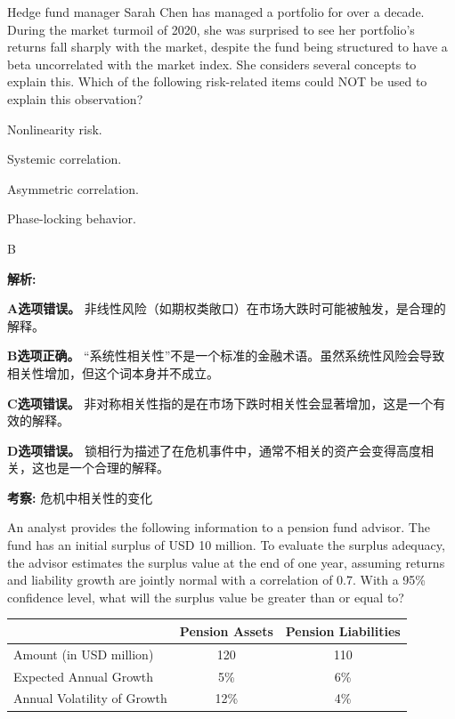\documentclass{article}
\newcounter{question} %
\newenvironment{explanation}
{\textbf{解析:}\par}
{\par}
\newcommand{\checklist}[1]{
    \textbf{考察:} #1 \par %
    \addcontentsline{toc}{subsection}{题号\thequestion 考察: #1} %
    \vspace{2em} %
}
\begin{document}
\begin{question}
    Hedge fund manager Sarah Chen has managed a portfolio for over a decade. During the market turmoil of 2020, she was surprised to see her portfolio's returns fall sharply with the market, despite the fund being structured to have a beta uncorrelated with the market index. She considers several concepts to explain this. Which of the following risk-related items could NOT be used to explain this observation?
\end{question}

\begin{choices}
    \item Nonlinearity risk.
    \item Systemic correlation.
    \item Asymmetric correlation.
    \item Phase-locking behavior.
\end{choices}

\begin{correctanswer}
    B
\end{correctanswer}

\begin{explanation}
    \textbf{A选项错误。}  
    非线性风险（如期权类敞口）在市场大跌时可能被触发，是合理的解释。

    \textbf{B选项正确。}  
    “系统性相关性”不是一个标准的金融术语。虽然系统性风险会导致相关性增加，但这个词本身并不成立。

    \textbf{C选项错误。}  
    非对称相关性指的是在市场下跌时相关性会显著增加，这是一个有效的解释。

    \textbf{D选项错误。}  
    锁相行为描述了在危机事件中，通常不相关的资产会变得高度相关，这也是一个合理的解释。
\end{explanation}
\checklist{危机中相关性的变化}


\begin{question}
    An analyst provides the following information to a pension fund advisor. The fund has an initial surplus of USD 10 million. To evaluate the surplus adequacy, the advisor estimates the surplus value at the end of one year, assuming returns and liability growth are jointly normal with a correlation of 0.7. With a 95\% confidence level, what will the surplus value be greater than or equal to?
    \begin{table}[htbp]
        \centering
        \renewcommand{\arraystretch}{1.2}
        \begin{tabular}{|l|c|c|}
            \hline
            & \textbf{Pension Assets} & \textbf{Pension Liabilities} \\
            \hline
            Amount (in USD million)     & 120             & 110                 \\
            Expected Annual Growth      & 5\%             & 6\%                 \\
            Annual Volatility of Growth & 12\%            & 4\%                 \\
            \hline
        \end{tabular}
    \end{table}
\end{question}
\end{document}
